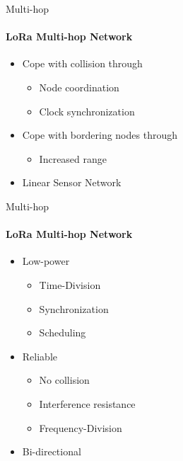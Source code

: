 \begin{frame}{Multi-hop}
\framesubtitle{LoRa Multi-hop Network}
\begin{itemize}
    \item Cope with collision through
    \begin{itemize}
        \item Node coordination
        \item Clock synchronization
    \end{itemize}
    \item Cope with bordering nodes through
    \begin{itemize}
        \item Increased range
    \end{itemize}
    \item Linear Sensor Network
\end{itemize}
\end{frame}

\begin{frame}{Multi-hop}
\framesubtitle{LoRa Multi-hop Network}
\begin{itemize}
    \item Low-power
    \begin{itemize}
        \item Time-Division
        \item Synchronization
        \item Scheduling
    \end{itemize}
    \item Reliable
    \begin{itemize}
        \item No collision
        \item Interference resistance
        \item Frequency-Division
    \end{itemize}
    \item Bi-directional
\end{itemize}
\end{frame}
